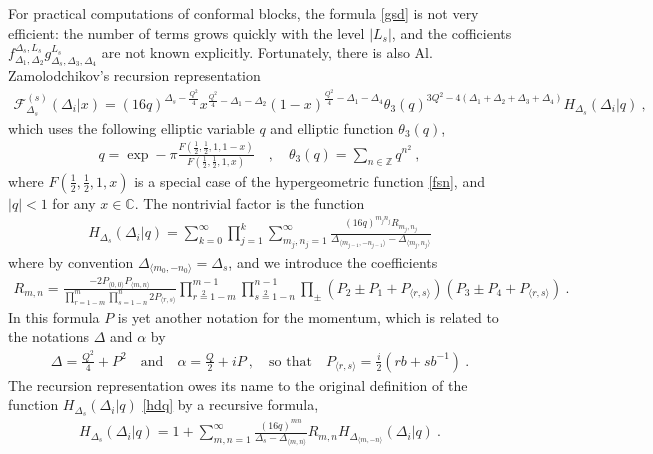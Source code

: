 \documentclass[12pt, a4paper, notitlepage, twoside]{report}
\numberwithin{equation}{section}
\theoremstyle{break}
\begin{document}
For practical computations of conformal blocks, the formula \eqref{gsd} is not very efficient: the number of terms grows quickly with the level $|L_s|$, and the cofficients $f_{\Delta_1,\Delta_2}^{\Delta_s,L_s} g^{L_s}_{\Delta_s,\Delta_3,\Delta_4}$ are not known explicitly.
Fortunately, there is also Al.
Zamolodchikov's recursion representation \cite{zz90}
\begin{align}
 \mathcal{F}^{(s)}_{\Delta_s}(\Delta_i|x) 
=  (16q)^{\Delta_s -\frac{Q^2}{4}} x^{\frac{Q^2}{4}-\Delta_1-\Delta_2} (1-x)^{\frac{Q^2}{4}-\Delta_1-\Delta_4} \theta_3(q)^{3Q^2-4(\Delta_1+\Delta_2+\Delta_3+\Delta_4)} H_{\Delta_s}(\Delta_i|q)\ ,
\end{align}
which uses the following elliptic variable $q$ and elliptic function $\theta_3(q)$,
\begin{align}
 q = \exp -\pi \frac{F(\frac12,\frac12,1,1-x)}{F(\frac12,\frac12,1,x)}  \quad , \quad \theta_3(q) = \sum_{n\in{\mathbb{Z}}} q^{n^2}\ ,
\end{align}
where $F(\frac12,\frac12,1,x)$ is a special case of the hypergeometric function \eqref{fsn}, and $|q|<1$ for any $x\in\mathbb{C}$.
The nontrivial factor is the function
\begin{align}
 H_{\Delta_s}(\Delta_i|q) = \sum_{k=0}^\infty \prod_{j=1}^k \sum_{m_j,n_j=1}^\infty \frac{(16q)^{m_jn_j}R_{m_j,n_j}}{\Delta_{\langle m_{j-1},-n_{j-1} \rangle}-\Delta_{\langle m_j,n_j\rangle}}
\label{hdq}
\end{align}
where by convention $\Delta_{\langle m_0,-n_0\rangle} = \Delta_s$, and we introduce the coefficients
\begin{align}
 R_{m,n} = \frac{-2P_{\langle 0,0\rangle} P_{\langle m,n\rangle}}{\prod_{r=1-m}^m \prod_{s=1-n}^n 2P_{\langle r,s\rangle}}
\prod_{r\overset{2}{=}1-m}^{m-1} \prod_{s\overset{2}{=}1-n}^{n-1} \prod_\pm (P_2\pm P_1 + P_{\langle r,s\rangle}) (P_3\pm P_4 +P_{\langle r,s\rangle})\ .
\end{align}
In this formula $P$ is yet another notation for the momentum, which is related to the notations $\Delta$ and $\alpha$ by
\begin{align}
 \Delta = \frac{Q^2}{4} + P^2 \quad \text{and} \quad \alpha = \frac{Q}{2}+iP\ , \quad \text{so that} \quad P_{\langle r,s\rangle} = \frac{i}{2}\left(rb+sb^{-1}\right)\ .
\end{align}
The recursion representation owes its name to the original definition of the function $H_{\Delta_s}(\Delta_i|q)$ \eqref{hdq} by a recursive formula,
\begin{align}
 H_{\Delta_s}(\Delta_i|q) = 1 + \sum_{m,n=1}^\infty \frac{(16q)^{mn}}{\Delta_s-\Delta_{\langle m,n\rangle}} R_{m,n} H_{\Delta_{\langle m,-n\rangle}}(\Delta_i|q)\ .
\end{align}
\end{document}
